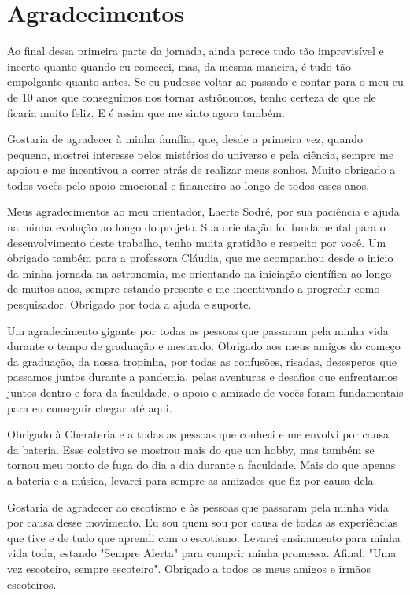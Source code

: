 \thispagestyle{empty}%

\chapter*{Agradecimentos}
Ao final dessa primeira parte da jornada, ainda parece tudo tão imprevisível e incerto quanto quando eu comecei, mas, da mesma maneira, é tudo tão empolgante quanto antes. Se eu pudesse voltar ao passado e contar para o meu eu de 10 anos que conseguimos nos tornar astrônomos, tenho certeza de que ele ficaria muito feliz. E é assim que me sinto agora também.

Gostaria de agradecer à minha família, que, desde a primeira vez, quando pequeno, mostrei interesse pelos mistérios do universo e pela ciência, sempre me apoiou e me incentivou a correr atrás de realizar meus sonhos. Muito obrigado a todos vocês pelo apoio emocional e financeiro ao longo de todos esses anos.

Meus agradecimentos ao meu orientador, Laerte Sodré, por sua paciência e ajuda na minha evolução ao longo do projeto. Sua orientação foi fundamental para o desenvolvimento deste trabalho, tenho muita gratidão e respeito por você. Um obrigado também para a professora Cláudia, que me acompanhou desde o início da minha jornada na astronomia, me orientando na iniciação científica ao longo de muitos anos, sempre estando presente e me incentivando a progredir como pesquisador. Obrigado por toda a ajuda e suporte.

Um agradecimento gigante por todas as pessoas que passaram pela minha vida durante o tempo de graduação e mestrado. Obrigado aos meus amigos do começo da graduação, da nossa tropinha, por todas as confusões, risadas, desesperos que passamos juntos durante a pandemia, pelas aventuras e desafios que enfrentamos juntos dentro e fora da faculdade, o apoio e amizade de vocês foram fundamentais para eu conseguir chegar até aqui.

Obrigado à Cherateria e a todas as pessoas que conheci e me envolvi por causa da bateria. Esse coletivo se mostrou mais do que um hobby, mas também se tornou meu ponto de fuga do dia a dia durante a faculdade. Mais do que apenas a bateria e a música, levarei para sempre as amizades que fiz por causa dela.

Gostaria de agradecer ao escotismo e às pessoas que passaram pela minha vida por causa desse movimento. Eu sou quem sou por causa de todas as experiências que tive e de tudo que aprendi com o escotismo. Levarei ensinamento para minha vida toda, estando "Sempre Alerta" para cumprir minha promessa. Afinal, "Uma vez escoteiro, sempre escoteiro". Obrigado a todos os meus amigos e irmãos escoteiros.

